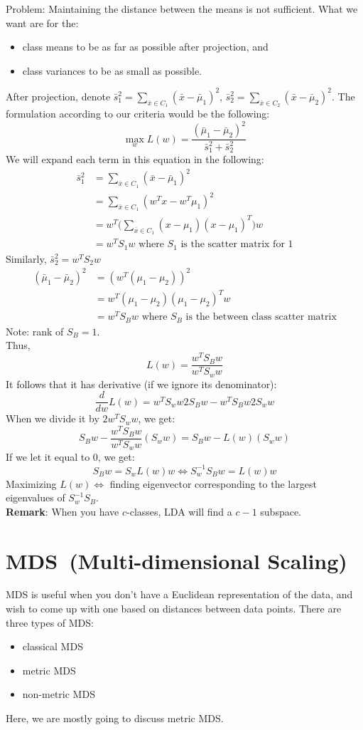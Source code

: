 \noindent Problem: Maintaining the distance between the means is not
sufficient. What we want are for the: 
\begin{itemize}
\item class means to be as far as possible after projection, and
\item class variances to be as small as possible.
\end{itemize}
After projection, denote $\bar{s}_1^2 = \sum_{\bar{x}\in C_1}
(\bar{x}-\bar{\mu}_1)^2$, $\bar{s}_2^2 = \sum_{\bar{x}\in C_2}
(\bar{x}-\bar{\mu}_2)^2$. The formulation according to our criteria
would be the following: 
\[
\max_{w} L(w)=\frac{(\bar{\mu}_1 - \bar{\mu}_2)^2}{\bar{s}_1^2+\bar{s}_2^2}
\]
We will expand each term in this equation in the following:\\
\begin{align*}
\bar{s}_1^2
&= \sum_{\bar{x}\in C_1} (\bar{x}-\bar{\mu}_1)^2\\
&= \sum_{\bar{x}\in C_1} (w^Tx-w^T\mu_1)^2\\
&= w^T\Big (\sum_{\bar{x}\in C_1} (x-\mu_1)(x-\mu_1)^T \Big ) w\\
&= w^TS_1w \textrm{ where } S_1 \textrm{ is the scatter matrix for }1
\end{align*}
Similarly, $\bar{s}_2^2=w^TS_2w$\\
\begin{align*}
(\bar{\mu}_1-\bar{\mu}_2)^2
&= (w^T (\mu_1 - \mu_2))^2\\
&= w^T(\mu_1-\mu_2)(\mu_1-\mu_2)^Tw\\
&= w^TS_Bw \textrm{ where } S_B \textrm{ is the between class scatter
    matrix} 
\end{align*}
Note: rank of $S_B = 1$.\\
Thus,
\[
L(w)=\frac{w^T S_B w}{w^T S_w w}
\]
It follows that it has derivative (if we ignore its denominator):
\[
\frac{d}{dw}L(w)=w^TS_w w2S_B w - w^T S_B w 2 S_w w
\]
When we divide it by $2w^TS_ww$, we get:
\[
S_Bw - \frac{w^T S_B w}{w^T S_w w} (S_w w)=S_Bw - L(w)(S_w w)
\]
If we let it equal to 0, we get:
\[
S_B w = S_w L(w) w \Leftrightarrow S_w^{-1} S_B w = L(w) w
\]
Maximizing $L(w) \Leftrightarrow$ finding eigenvector corresponding to
the largest eigenvalues of $S_w^{-1} S_B$.\\ 

\noindent \textbf{Remark}: When you have $c$-classes, LDA will find a
$c-1$ subspace. \\ 

\section{MDS~(Multi-dimensional Scaling)}
MDS is useful when you don't have a Euclidean representation of the
data, and wish to come up with one based on distances between data
points. There are three types of MDS: 
\begin{itemize}
\item classical MDS
\item metric MDS
\item non-metric MDS
\end{itemize}
Here, we are mostly going to discuss metric MDS.\\
